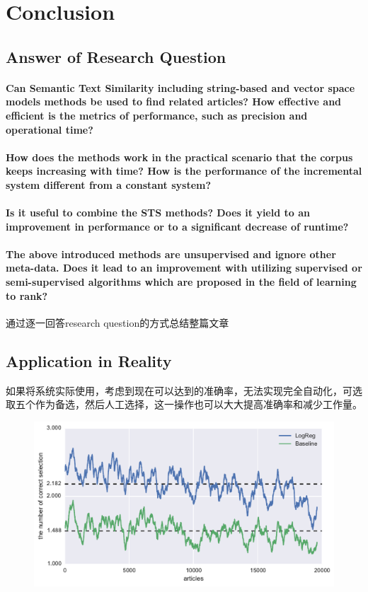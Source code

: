 \section{Conclusion}

\subsection{Answer of Research Question}

\paragraph{Can Semantic Text Similarity including string-based and vector space models methods be used to find related articles? How effective and efficient is the metrics of performance, such as precision and operational time?}
\paragraph{How does the methods work in the practical scenario that the corpus keeps increasing with time? How is the performance of the incremental system different from a constant system? }
\paragraph{Is it useful to combine the STS methods? Does it yield to an improvement in performance or to a significant decrease of runtime?}
\paragraph{The above introduced methods are unsupervised and ignore other meta-data. Does it lead to an improvement with utilizing supervised or semi-supervised algorithms which are proposed in the field of learning to rank?}
通过逐一回答research question的方式总结整篇文章

\subsection{Application in Reality}
如果将系统实际使用，考虑到现在可以达到的准确率，无法实现完全自动化，可选取五个作为备选，然后人工选择，这一操作也可以大大提高准确率和减少工作量。

\begin{figure}[!htb]
    \centering
    \includegraphics[width=\textwidth]{fig/precision_inc_supervised_5}
    \caption[]{}
    \label{fig:top5}
\end{figure}

